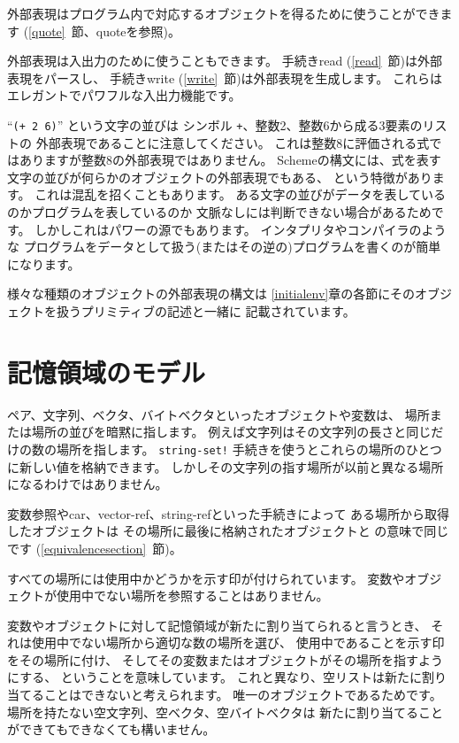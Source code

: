 外部表現はプログラム内で対応するオブジェクトを得るために使うことができます
(\ref{quote}~節、{\cf quote}を参照)。

外部表現は入出力のために使うこともできます。
手続き{\cf read} (\ref{read}~節)は外部表現をパースし、
手続き{\cf write} (\ref{write}~節)は外部表現を生成します。
これらはエレガントでパワフルな入出力機能です。

``{\tt(+ 2 6)}'' という文字の並びは
シンボル {\tt +}、整数2、整数6から成る3要素のリストの
外部表現であることに注意してください。
これは整数8に評価される式ではありますが整数8の外部表現ではありません。
Schemeの構文には、式を表す文字の並びが何らかのオブジェクトの外部表現でもある、
という特徴があります。
これは混乱を招くこともあります。
ある文字の並びがデータを表しているのかプログラムを表しているのか
文脈なしには判断できない場合があるためです。
しかしこれはパワーの源でもあります。
インタプリタやコンパイラのような
プログラムをデータとして扱う(またはその逆の)プログラムを書くのが簡単になります。

様々な種類のオブジェクトの外部表現の構文は
\ref{initialenv}章の各節にそのオブジェクトを扱うプリミティブの記述と一緒に
記載されています。

\section{記憶領域のモデル}
\label{storagemodel}

ペア、文字列、ベクタ、バイトベクタといったオブジェクトや変数は、
場所または場所の並びを暗黙に指します。
例えば文字列はその文字列の長さと同じだけの数の場所を指します。
{\tt string-set!} 手続きを使うとこれらの場所のひとつに新しい値を格納できます。
しかしその文字列の指す場所が以前と異なる場所になるわけではありません。

変数参照や{\cf car}、{\cf vector-ref}、{\cf string-ref}といった手続きによって
ある場所から取得したオブジェクトは
その場所に最後に格納されたオブジェクトと の意味で同じです
(\ref{equivalencesection}~節)。

すべての場所には使用中かどうかを示す印が付けられています。
変数やオブジェクトが使用中でない場所を参照することはありません。

変数やオブジェクトに対して記憶領域が新たに割り当てられると言うとき、
それは使用中でない場所から適切な数の場所を選び、
使用中であることを示す印をその場所に付け、
そしてその変数またはオブジェクトがその場所を指すようにする、
ということを意味しています。
これと異なり、空リストは新たに割り当てることはできないと考えられます。
唯一のオブジェクトであるためです。
場所を持たない空文字列、空ベクタ、空バイトベクタは
新たに割り当てることができてもできなくても構いません。


